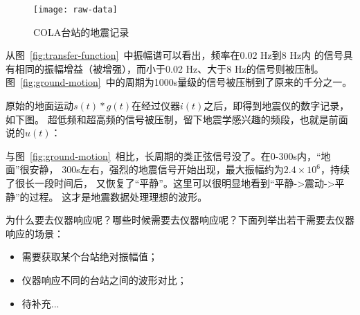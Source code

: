 \begin{figure}[H]
\centering
\texttt{[image: raw-data]}
\caption{COLA台站的地震记录}
\end{figure}

从图~\ref{fig:transfer-function}~中振幅谱可以看出，频率在0.02 Hz到8 Hz内
的信号具有相同的振幅增益（被增强），而小于0.02 Hz、大于8 Hz的信号则被压制。
图~\ref{fig:ground-motion}~中的周期为1000s量级的信号被压制到了原来的千分之一。

原始的地面运动$s(t)*g(t)$在经过仪器$i(t)$之后，即得到地震仪的数字记录，如下图。
超低频和超高频的信号被压制，留下地震学感兴趣的频段，也就是前面说的$u(t)$：

与图~\ref{fig:ground-motion}~相比，长周期的类正弦信号没了。在0-300s内，“地面”很安静，
300s左右，强烈的地震信号开始出现，最大振幅约为$2.4\times10^6$，持续了很长一段时间后，
又恢复了“平静”。这里可以很明显地看到“平静->震动->平静”的过程。
这才是地震数据处理理想的波形。

为什么要去仪器响应呢？哪些时候需要去仪器响应呢？下面列举出若干需要去仪器响应的场景：
\begin{itemize}
\item 需要获取某个台站绝对振幅值；
\item 仪器响应不同的台站之间的波形对比；
\item 待补充...
\end{itemize}
